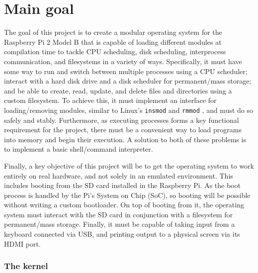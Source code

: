 \documentclass[10pt,a4paper]{article}
\newcommand{\code}[1]{\texttt{#1}}
\begin{document}
\section*{Main goal}
The goal of this project is to create a modular operating system for the
Raspberry Pi 2 Model B that is capable of loading different modules at
compilation time to tackle CPU scheduling, disk scheduling, interprocess
communication, and filesystems in a variety of ways. Specifically, it must have
some way to run and switch between multiple processes using a CPU scheduler;
interact with a hard disk drive and a disk scheduler for permanent/mass storage;
and be able to create, read, update, and delete files and directories using a
custom filesystem.  To achieve this, it must implement an interface for
loading/removing modules, similar to Linux's \code{insmod} and \code{rmmod}
\cite{insmod}, and must do so safely and stably.  Furthermore, as executing
processes forms a key functional requirement for the project, there must be a
convenient way to load programs into memory and begin their execution. A
solution to both of these problems is to implement a basic shell/command
interpreter.

Finally, a key objective of this project will be to get the operating system to
work entirely on real hardware, and not solely in an emulated environment. This
includes booting from the SD card installed in the Raspberry Pi. As the boot
process is handled by the Pi's System on Chip (SoC), so booting will be possible
without writing a custom bootloader. On top of booting from it, the operating
system must interact with the SD card in conjunction with a filesystem for
permanent/mass storage. Finally, it must be capable of taking input from a
keyboard connected via USB, and printing output to a physical screen via its
HDMI port.

\subsubsection*{The kernel}
\end{document}
